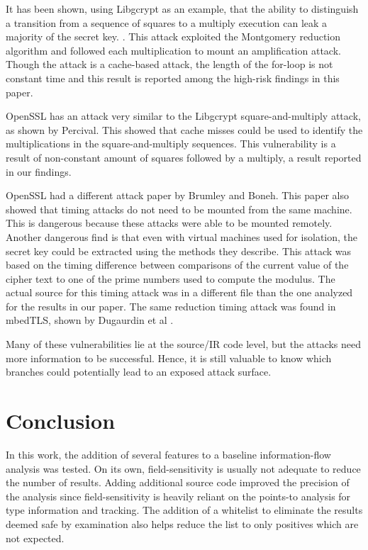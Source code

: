    It has been shown, using Libgcrypt as an example, that the ability to
   distinguish a transition from a sequence of squares to a multiply
   execution can leak a majority of the secret key.
   \cite{bernstein2017sliding}. This attack exploited the Montgomery reduction
   algorithm and followed each multiplication to mount an amplification
   attack. Though the attack is a cache-based attack, the length of the for-loop
   is not constant time and this result is reported among the high-risk findings
   in this paper.

   OpenSSL has an attack very similar to the Libgcrypt square-and-multiply
   attack, as shown by Percival\cite{percival2005cache}. This showed that
   cache misses could be used to identify the multiplications in the
   square-and-multiply sequences. This vulnerability is a result of non-constant
   amount of squares followed by a multiply, a result reported in our findings.

   OpenSSL had a different attack paper by Brumley and
   Boneh\cite{brumley2005remote}. This paper also showed that timing attacks do
   not need to be mounted from the same machine. This is dangerous because these
   attacks were able to be mounted remotely. Another dangerous find is that even
   with virtual machines used for isolation, the secret key could be extracted
   using the methods they describe. This attack was based on the timing difference
   between comparisons of the current value of the cipher text to one of the prime
   numbers used to compute the modulus. The actual source for this timing attack
   was in a different file than the one analyzed for the results in our paper.
   The same reduction timing attack was found in mbedTLS, shown by Dugaurdin et
   al \cite{mbedtlsreductions,kochertiming}.

   Many of these vulnerabilities lie at the source/IR code level, but the
   attacks need more information to be successful. Hence, it is still valuable
   to know which branches could potentially lead to an exposed attack surface.

\section{Conclusion}
   In this work, the addition of several features to a baseline information-flow
   analysis was tested. On its own, field-sensitivity is usually not adequate to
   reduce the number of results. Adding additional source code improved the precision of the analysis since
   field-sensitivity is heavily reliant on the points-to analysis for type
   information and tracking. The
   addition of a whitelist to eliminate the results deemed safe by
   examination also helps reduce the list to only positives which are
   not expected.

